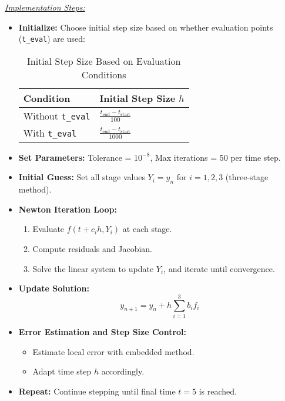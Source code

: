 \documentclass[journal]{IEEEtran}
\begin{document}
\underline{\textit{Implementation Steps:}}
\begin{itemize}
    \item \textbf{Initialize:} Choose initial step size based on whether evaluation points (\texttt{t\_eval}) are used:

    \vspace{0.5em}
    \begin{table}[H]
    \centering
    \caption{Initial Step Size Based on Evaluation Conditions}
    \begin{tabular}{|l|l|}
        \hline
        \textbf{Condition} & \textbf{Initial Step Size \( h \)} \\
        \hline
        Without \texttt{t\_eval} & \( \frac{t_{\text{end}} - t_{\text{start}}}{100} \) \\
        \hline
        With \texttt{t\_eval}    & \( \frac{t_{\text{end}} - t_{\text{start}}}{1000} \) \\
        \hline
    \end{tabular}
    \end{table}

    \item \textbf{Set Parameters:} Tolerance = \(10^{-8}\), Max iterations = 50 per time step.
    \item \textbf{Initial Guess:} Set all stage values \( Y_i = y_n \) for \( i = 1, 2, 3 \) (three-stage method).
    \item \textbf{Newton Iteration Loop:}
    \begin{enumerate}
        \item Evaluate \( f(t + c_i h, Y_i) \) at each stage.
        \item Compute residuals and Jacobian.
        \item Solve the linear system to update \( Y_i \), and iterate until convergence.
    \end{enumerate}
    \item \textbf{Update Solution:}
    \[
    y_{n+1} = y_n + h \sum_{i=1}^{3} b_i f_i
    \]
    \item \textbf{Error Estimation and Step Size Control:}
    \begin{itemize}
        \item Estimate local error with embedded method.
        \item Adapt time step \( h \) accordingly.
    \end{itemize}
    \item \textbf{Repeat:} Continue stepping until final time \( t = 5 \) is reached.
\end{itemize}
\end{document}
